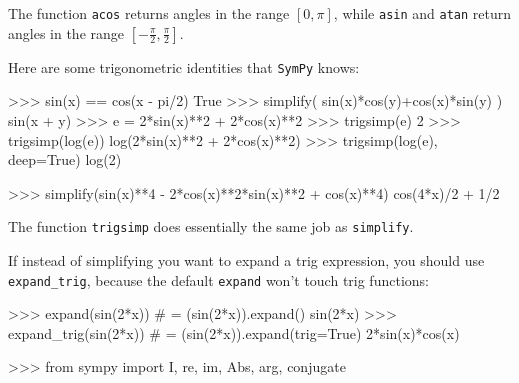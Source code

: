 \noindent
The function \texttt{acos} returns angles in the range $[0,\pi]$,
while \texttt{asin} and \texttt{atan} return angles in the range $[-\frac{\pi}{2},\frac{\pi}{2}]$.


Here are some trigonometric identities that \texttt{SymPy} knows:												

\small
\begin{verbatimtab}
>>> sin(x) == cos(x - pi/2)      
True
>>> simplify( sin(x)*cos(y)+cos(x)*sin(y) )
sin(x + y)
>>> e = 2*sin(x)**2 + 2*cos(x)**2
>>> trigsimp(e)
2
>>> trigsimp(log(e))
log(2*sin(x)**2 + 2*cos(x)**2)
>>> trigsimp(log(e), deep=True)
log(2)
\end{verbatimtab}
\normalsize

\small
\begin{verbatimtab}
>>> simplify(sin(x)**4 - 2*cos(x)**2*sin(x)**2 + cos(x)**4)
cos(4*x)/2 + 1/2
\end{verbatimtab}
\normalsize

\noindent
The function \texttt{trigsimp} does essentially the same job as \texttt{simplify}.

If instead of simplifying you want to expand a trig expression,
you should use \texttt{expand\_trig}, because the default \texttt{expand} won't touch trig functions:

\small
\begin{verbatimtab}
>>> expand(sin(2*x))        # = (sin(2*x)).expand()
sin(2*x)
>>> expand_trig(sin(2*x))   # = (sin(2*x)).expand(trig=True)
2*sin(x)*cos(x)
\end{verbatimtab}
\normalsize






\label{sec:sympytut_complex_numbers}
\small
\begin{verbatimtab}
>>> from sympy import I, re, im, Abs, arg, conjugate
\end{verbatimtab}
\normalsize

